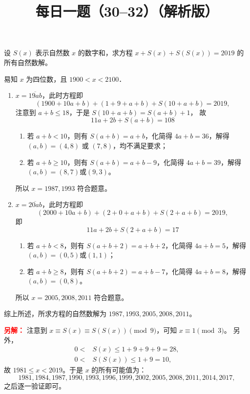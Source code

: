 \documentclass[a4paper,answers]{exam}
\title{\huge \heiti \color{dblue} 每日一题（30--32）（解析版）\\\pgfornament[scale=0.4]{84}}
\author{}
\date{}
\begin{document}
\maketitle

\thispagestyle{headandfoot}


\begin{questions}

\setcounter{question}{29}

\question
设 $S(x)$ 表示自然数 $x$ 的数字和，求方程 $x+S(x)+S\left(S\left(x\right)\right)=2019$ 的所有自然数解。

\begin{solution}[\stretch{1}]
    易知 $x$ 为四位数，且 $1900<x<2100$．

    \begin{enumerate}[label={(\arabic*)}]
        \item $x=\overline{19ab}$，此时方程即 \[(1900+10a+b)+(1+9+a+b)+S(10+a+b)=2019,\]
        注意到 $a+b \leqslant 18$，于是 $S(10+a+b)=S(a+b)+1$，
        故 \[11a+2b+S(a+b)=108\]
        \begin{enumerate}[label={(\roman*)}]
            \item 若 $a+b<10$，则有 $S(a+b)=a+b$，化简得 $4a+b=36$，解得 $(a,b)=(4,8) \text{~或~} (7,8)$，均不满足要求；
            \item 若 $a+b\geqslant 10$，则有 $S(a+b)=a+b-9$，化简得 $4a+b=39$，解得 $(a,b)=(8,7) \text{或} (9,3)$。
        \end{enumerate}
        所以 $x=1987,1993$ 符合题意。
        \item $x=\overline{20ab}$，此时方程即\[(2000+10a+b)+(2+0+a+b)+S(2+a+b)=2019,\]即\[11a+2b+S(2+a+b)=17\]
        \begin{enumerate}[label={\roman*)}]
            \item 若 $a+b<8$，则有 $S(a+b+2)=a+b+2$，化简得 $4a+b=5$，解得 $(a,b)=(0,5) \text{或} (1,1)$；
            \item 若 $a+b\geqslant 8$，则有 $S(a+b+2)=a+b-7$，化简得 $4a+b=8$，解得 $(a,b)=(0,8)$。
        \end{enumerate}
        所以 $x=2005,2008,2011$ 符合题意。
    \end{enumerate}

    综上所述，所求方程的自然数解为 $1987,1993,2005,2008,2011$。

    \textcolor{red}{\textbf{另解：}}
    注意到 $x \equiv S(x) \equiv S\left(S\left(x\right)\right) \pmod{9}$，可知 $x \equiv 1 \pmod{3}$。
    另外，
    \[
        \begin{aligned}
            0<&S(x)\leqslant 1+9+9+9=28, \\
            0<&S\left(S\left(x\right)\right)\leqslant 1+9=10,
        \end{aligned}
    \]
    故 $1981\leqslant x < 2019$。于是 $x$ 的所有可能值为：
    \[1981,1984,1987,1990,1993,1996,1999,2002,2005,2008,2011,2014,2017,\]
    之后逐一验证即可。
\end{solution}


\end{questions}
\end{document}
